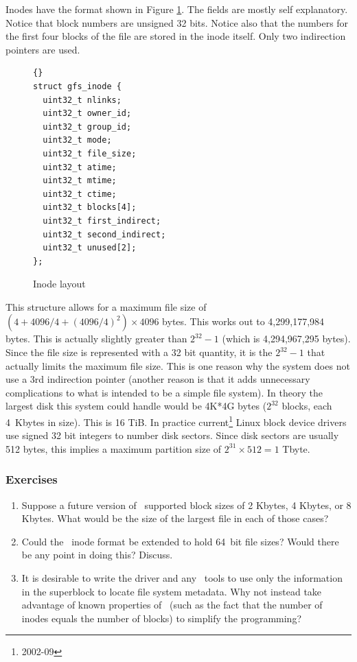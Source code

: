 Inodes have the format shown in Figure \ref{fig:inode-layout}. The fields are mostly self
explanatory. Notice that block numbers are unsigned 32 bits. Notice also that the numbers for
the first four blocks of the file are stored in the inode itself. Only two indirection pointers
are used.

\begin{figure}[htbp]
  \centering
  \begin{bigbox}
\begin{lstlisting}{}
struct gfs_inode {
  uint32_t nlinks;
  uint32_t owner_id;
  uint32_t group_id;
  uint32_t mode;
  uint32_t file_size;
  uint32_t atime;
  uint32_t mtime;
  uint32_t ctime;
  uint32_t blocks[4];
  uint32_t first_indirect;
  uint32_t second_indirect;
  uint32_t unused[2];
};
\end{lstlisting}
  \end{bigbox}
  \caption{Inode layout}
  \label{fig:inode-layout}
\end{figure}

This structure allows for a maximum file size of $(4 + 4096/4 + (4096/4)^2) \times 4096$ bytes.
This works out to 4,299,177,984 bytes. This is actually slightly greater than $2^{32} - 1$
(which is 4,294,967,295 bytes). Since the file size is represented with a 32 bit quantity, it is
the $2^{32} - 1$ that actually limits the maximum file size. This is one reason why the system
does not use a 3rd indirection pointer (another reason is that it adds unnecessary complications
to what is intended to be a simple file system). In theory the largest disk this system could
handle would be 4K*4G bytes ($2^{32}$ blocks, each 4~Kbytes in size). This is 16 TiB. In
practice current\footnote{2002-09} Linux block device drivers use signed 32 bit integers to
number disk sectors. Since disk sectors are usually 512 bytes, this implies a maximum partition
size of $2^{31} \times 512 = 1$ Tbyte.

\subsubsection*{Exercises}

\begin{enumerate}

\item Suppose a future version of \GenericFS\ supported block sizes of 2 Kbytes, 4 Kbytes, or 8
  Kbytes. What would be the size of the largest file in each of those cases?

\item Could the \GenericFS\ inode format be extended to hold 64~bit file sizes? Would there be
  any point in doing this? Discuss.

\item It is desirable to write the driver and any \GenericFS\ tools to use only the information
  in the superblock to locate file system metadata. Why not instead take advantage of known
  properties of \GenericFS\ (such as the fact that the number of inodes equals the number of
  blocks) to simplify the programming?

\end{enumerate}

